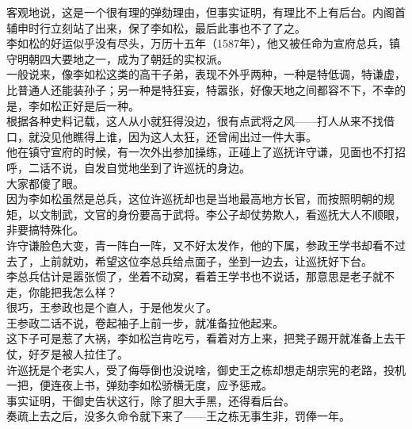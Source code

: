 \begin{multicols}{\theparacolNo}
客观地说，这是一个很有理的弹劾理由，但事实证明，有理比不上有后台。内阁首辅申时行立刻站了出来，保了李如松，最后此事也不了了之。\\

李如松的好运似乎没有尽头，万历十五年（1587年），他又被任命为宣府总兵，镇守明朝四大要地之一，成为了朝廷的实权派。\\

一般说来，像李如松这类的高干子弟，表现不外乎两种，一种是特低调，特谦虚，比普通人还能装孙子；另一种是特狂妄，特嚣张，好像天地之间都容不下，不幸的是，李如松正好是后一种。\\

根据各种史料记载，这人从小就狂得没边，很有点武将之风——打人从来不找借口，就没见他瞧得上谁，因为这人太狂，还曾闹出过一件大事。\\

他在镇守宣府的时候，有一次外出参加操练，正碰上了巡抚许守谦，见面也不打招呼，二话不说，自发自觉地坐到了许巡抚的身边。\\

大家都傻了眼。\\

因为李如松虽然是总兵，这位许巡抚却也是当地最高地方长官，而按照明朝的规矩，以文制武，文官的身份要高于武将。李公子却仗势欺人，看巡抚大人不顺眼，非要搞特殊化。\\

许守谦脸色大变，青一阵白一阵，又不好太发作，他的下属，参政王学书却看不过去了，上前就劝，希望这位李总兵给点面子，坐到一边去，让巡抚好下台。\\

李总兵估计是嚣张惯了，坐着不动窝，看着王学书也不说话，那意思是老子就不走，你能把我怎么样？\\

很巧，王参政也是个直人，于是他发火了。\\

王参政二话不说，卷起袖子上前一步，就准备拉他起来。\\

这下子可是惹了大祸，李如松岂肯吃亏，看着对方上来，把凳子踢开就准备上去干仗，好歹是被人拉住了。\\

许巡抚是个老实人，受了侮辱倒也没说啥，御史王之栋却想走胡宗宪的老路，投机一把，便连夜上书，弹劾李如松骄横无度，应予惩戒。\\

事实证明，干御史告状这行，除了胆大手黑，还得看后台。\\

奏疏上去之后，没多久命令就下来了——王之栋无事生非，罚俸一年。\\


\end{multicols}
